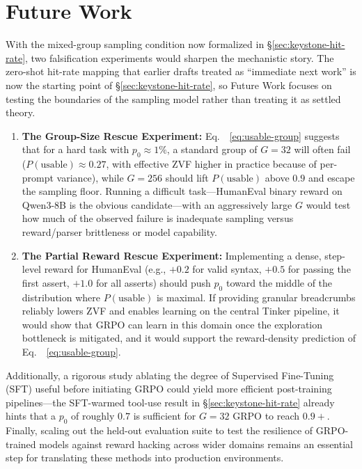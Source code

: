 \documentclass[12pt,a4paper]{report}
\begin{document}
\section{Future Work}
\label{sec:future-work}
With the mixed-group sampling condition now formalized in §\ref{sec:keystone-hit-rate}, two falsification experiments would sharpen the mechanistic story. The zero-shot hit-rate mapping that earlier drafts treated as ``immediate next work'' is now the starting point of §\ref{sec:keystone-hit-rate}, so Future Work focuses on testing the boundaries of the sampling model rather than treating it as settled theory.

\begin{enumerate}
    \item \textbf{The Group-Size Rescue Experiment:} Eq.\ ~\eqref{eq:usable-group} suggests that for a hard task with $p_0\approx 1\%$, a standard group of $G=32$ will often fail ($P(\text{usable})\approx 0.27$, with effective ZVF higher in practice because of per-prompt variance), while $G=256$ should lift $P(\text{usable})$ above $0.9$ and escape the sampling floor. Running a difficult task---HumanEval binary reward on Qwen3-8B is the obvious candidate---with an aggressively large $G$ would test how much of the observed failure is inadequate sampling versus reward/parser brittleness or model capability.
    \item \textbf{The Partial Reward Rescue Experiment:} Implementing a dense, step-level reward for HumanEval (e.g., $+0.2$ for valid syntax, $+0.5$ for passing the first assert, $+1.0$ for all asserts) should push $p_0$ toward the middle of the distribution where $P(\text{usable})$ is maximal. If providing granular breadcrumbs reliably lowers ZVF and enables learning on the central Tinker pipeline, it would show that GRPO can learn in this domain once the exploration bottleneck is mitigated, and it would support the reward-density prediction of Eq.\ ~\eqref{eq:usable-group}.
\end{enumerate}

Additionally, a rigorous study ablating the degree of Supervised Fine-Tuning (SFT) useful before initiating GRPO could yield more efficient post-training pipelines---the SFT-warmed tool-use result in §\ref{sec:keystone-hit-rate} already hints that a $p_0$ of roughly $0.7$ is sufficient for $G=32$ GRPO to reach $0.9+$. Finally, scaling out the held-out evaluation suite to test the resilience of GRPO-trained models against reward hacking across wider domains remains an essential step for translating these methods into production environments.
\end{document}
